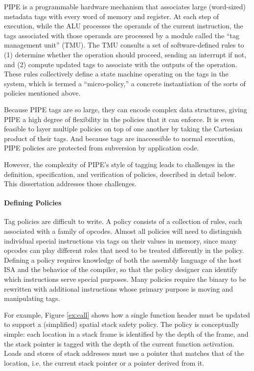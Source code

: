 \documentclass{report}
\begin{document}
PIPE is a programmable hardware mechanism that associates large (word-sized) metadata tags
with every word of memory and register. At each step of execution, while the ALU processes
the operands of the current instruction, the tags associated with those operands are processed
by a module called the ``tag management unit'' (TMU).
The TMU consults a set of software-defined rules to (1) determine whether the operation should
proceed, sending an interrupt if not, and (2) compute updated tags to associate with the
outputs of the operation. These rules collectively define a state machine operating on the
tags in the system, which is termed a ``micro-policy,'' a concrete instantiation of the
sorts of policies mentioned above.

Because PIPE tags are so large, they can encode complex data structures, giving PIPE a high
degree of flexibility in the policies that it can enforce. It is even feasible to layer
multiple policies on top of one another by taking the Cartesian product of their tags.
And because tags are inaccessible to normal execution, PIPE policies are protected from
subversion by application code.

However, the complexity of PIPE's style of tagging leads to challenges in the definition,
specification, and verification of policies, described in detail below. This dissertation
addresses those challenges.

\paragraph{Defining Policies}

Tag policies are difficult to write.
A policy consists of a collection of rules, each associated with a family of opcodes.
Almost all policies will need to distinguish
individual special instructions via tags on their values in memory, since many opcodes can
play different roles that need to be
treated differently in the policy. Defining a policy requires knowledge of both the assembly
language of the host ISA and the behavior of the compiler, so that the policy designer can
identify which instructions serve special purposes. Many policies require the binary
to be rewritten with additional instructions whose primary purpose is moving and manipulating
tags.

For example, Figure \ref{ex:call} shows how a single function header must be updated to
support a (simplified) spatial stack safety policy. The policy is conceptually simple:
each location in a stack frame is identified by the depth of the frame, and the stack pointer
is tagged with the depth of the current function activation.  Loads and stores of stack
addresses must use a pointer that matches that of the location, i.e. the current stack pointer
or a pointer derived from it.
\end{document}
